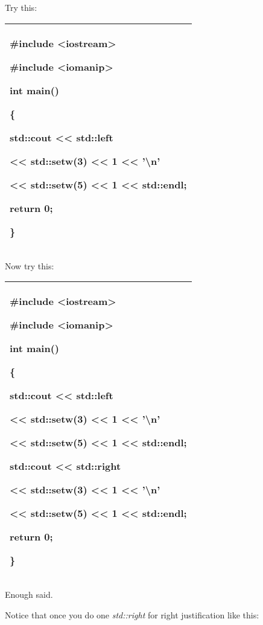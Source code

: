 \documentclass[
]{article}
\begin{document}
Try this:

\begin{longtable}[]{@{}l@{}}
\toprule
\endhead
\begin{minipage}[t]{0.97\columnwidth}\raggedright
\#include \textless iostream\textgreater{}

\#include \textless iomanip\textgreater{}

int main()

\{

std::cout \textless\textless{} std::left

\textless\textless{} std::setw(3) \textless\textless{} 1
\textless\textless{} '\textbackslash n'

\textless\textless{} std::setw(5) \textless\textless{} 1
\textless\textless{} std::endl;

return 0;

\}\strut
\end{minipage}\tabularnewline
\bottomrule
\end{longtable}

Now try this:

\begin{longtable}[]{@{}l@{}}
\toprule
\endhead
\begin{minipage}[t]{0.97\columnwidth}\raggedright
\#include \textless iostream\textgreater{}

\#include \textless iomanip\textgreater{}

int main()

\{

std::cout \textless\textless{} std::left

\textless\textless{} std::setw(3) \textless\textless{} 1
\textless\textless{} '\textbackslash n'

\textless\textless{} std::setw(5) \textless\textless{} 1
\textless\textless{} std::endl;

std::cout \textless\textless{} std::right

\textless\textless{} std::setw(3) \textless\textless{} 1
\textless\textless{} '\textbackslash n'

\textless\textless{} std::setw(5) \textless\textless{} 1
\textless\textless{} std::endl;

return 0;

\}\strut
\end{minipage}\tabularnewline
\bottomrule
\end{longtable}

Enough said.

Notice that once you do one \emph{std::right} for right justification
like this:
\end{document}
